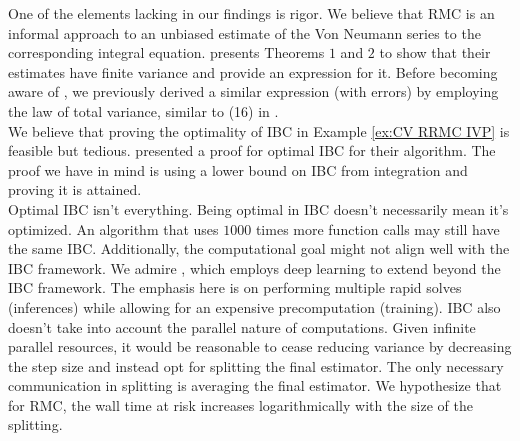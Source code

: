 \documentclass[a4paper,12pt]{article}
\begin{document}
One of the elements lacking in our findings is rigor.  We believe
that RMC is an informal approach to an unbiased estimate of
the Von Neumann series to the corresponding integral equation.
\cite{ermakov_monte_2021} presents Theorems $1$ and $2$ to
show that their estimates have finite variance and provide an expression for it.
Before becoming aware of \cite{ermakov_monte_2021}, we
previously derived a similar expression (with errors)
by employing the law of total variance, similar to (16) in \cite{rath_ears_2022}. \\
We believe that proving the optimality of IBC in Example \ref{ex:CV RRMC IVP} is feasible
but tedious.
\cite{daun_randomized_2011} presented a proof for optimal IBC for their algorithm.
The proof we have in mind is using a lower bound on IBC
from integration and proving it is attained.\\

Optimal IBC isn't everything. Being optimal in IBC doesn't necessarily mean it's optimized.
An algorithm that uses $1000$ times more function calls may still have the same
IBC. Additionally, the computational goal
might not align well with the IBC framework.
We admire \cite{becker_learning_2022},
which employs deep learning to extend beyond the IBC framework.
The emphasis here is on performing multiple rapid solves (inferences)
while allowing for an expensive precomputation (training).
IBC also doesn't take into account the parallel nature of computations.
Given infinite parallel resources, it would be reasonable to cease reducing
variance by decreasing the step size and instead opt for splitting the final estimator.
The only necessary communication in splitting is averaging the final
estimator. We hypothesize that for RMC, the wall time at risk
increases logarithmically with the size of the splitting.



\newpage
\begin{abstract}
    
\end{abstract}

\printbibliography
\newpage
\end{document}
